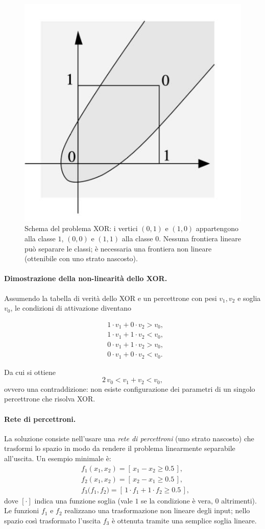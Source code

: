 \begin{figure}[htbp]
	\centering
	\includegraphics[width=.55\linewidth]{images/xor-schema.jpg}
	\caption{Schema del problema XOR: i vertici \((0,1)\) e \((1,0)\) appartengono alla classe \(1\), \((0,0)\) e \((1,1)\) alla classe \(0\). Nessuna frontiera lineare può separare le classi; è necessaria una frontiera non lineare (ottenibile con uno strato nascosto).}
	\label{fig:xor-schema}
\end{figure}

\paragraph{Dimostrazione della non-linearità dello XOR.} Assumendo la tabella di verità dello XOR e un percettrone con pesi \(v_1,v_2\) e soglia \(v_0\), le condizioni di attivazione diventano

\[
\begin{aligned}
	&1\cdot v_1 + 0\cdot v_2 > v_0,\\
	&1\cdot v_1 + 1\cdot v_2 < v_0,\\
	&0\cdot v_1 + 1\cdot v_2 > v_0,\\
	&0\cdot v_1 + 0\cdot v_2 < v_0.
\end{aligned}
\]

Da cui si ottiene
\[
2\,v_0 < v_1 + v_2 < v_0,
\]
ovvero una contraddizione: non esiste configurazione dei parametri di un singolo percettrone che risolva XOR.

\paragraph{Rete di percettroni.} La soluzione consiste nell’usare una \emph{rete di percettroni} (uno strato nascosto) che trasformi lo spazio in modo da rendere il problema linearmente separabile all’uscita. Un esempio minimale è:
\[
\begin{aligned}
	&f_1(x_1,x_2) = [\,x_1 - x_2 \ge 0.5\,],\\
	&f_2(x_1,x_2) = [\,x_2 - x_1 \ge 0.5\,],\\
	&f_3\big(f_1,f_2\big) = [\,1\cdot f_1 + 1\cdot f_2 \ge 0.5\,],
\end{aligned}
\]
dove \([\cdot]\) indica una funzione soglia (vale \(1\) se la condizione è vera, \(0\) altrimenti). Le funzioni \(f_1\) e \(f_2\) realizzano una trasformazione non lineare degli input; nello spazio così trasformato l’uscita \(f_3\) è ottenuta tramite una semplice soglia lineare.

